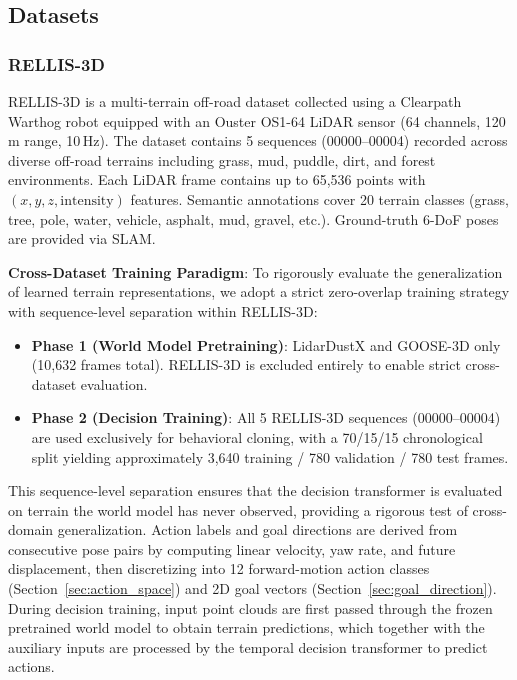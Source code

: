 \documentclass[journal]{IEEEtran}
\begin{document}
\subsection{Datasets}

\subsubsection{RELLIS-3D}
RELLIS-3D \cite{jiang2021} is a multi-terrain off-road dataset collected using a Clearpath Warthog robot equipped with an Ouster OS1-64 LiDAR sensor (64 channels, 120\,m range, 10\,Hz). The dataset contains 5 sequences (00000--00004) recorded across diverse off-road terrains including grass, mud, puddle, dirt, and forest environments. Each LiDAR frame contains up to 65,536 points with $(x, y, z, \text{intensity})$ features. Semantic annotations cover 20 terrain classes (grass, tree, pole, water, vehicle, asphalt, mud, gravel, etc.). Ground-truth 6-DoF poses are provided via SLAM.

\textbf{Cross-Dataset Training Paradigm}: To rigorously evaluate the generalization of learned terrain representations, we adopt a strict zero-overlap training strategy with sequence-level separation within RELLIS-3D:

\begin{itemize}
    \item \textbf{Phase 1 (World Model Pretraining)}: LidarDustX and GOOSE-3D only (10,632 frames total). RELLIS-3D is excluded entirely to enable strict cross-dataset evaluation.
    \item \textbf{Phase 2 (Decision Training)}: All 5 RELLIS-3D sequences (00000--00004) are used exclusively for behavioral cloning, with a 70/15/15 chronological split yielding approximately 3,640 training / 780 validation / 780 test frames.
\end{itemize}

This sequence-level separation ensures that the decision transformer is evaluated on terrain the world model has never observed, providing a rigorous test of cross-domain generalization. Action labels and goal directions are derived from consecutive pose pairs by computing linear velocity, yaw rate, and future displacement, then discretizing into 12 forward-motion action classes (Section~\ref{sec:action_space}) and 2D goal vectors (Section~\ref{sec:goal_direction}). During decision training, input point clouds are first passed through the frozen pretrained world model to obtain terrain predictions, which together with the auxiliary inputs are processed by the temporal decision transformer to predict actions.
\end{document}
